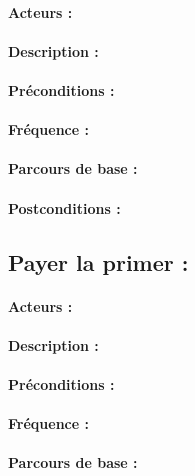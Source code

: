 \documentclass[../annexe.tex]{subfiles}
\begin{document}
\paragraph{Acteurs :}

\paragraph{Description :}

\paragraph{Préconditions :}

\paragraph{Fréquence :}

\paragraph{Parcours de base :}

\paragraph{Postconditions :}

\newpage

\subsection{Payer la primer :}

\paragraph{Acteurs :}

\paragraph{Description :}

\paragraph{Préconditions :}

\paragraph{Fréquence :}

\paragraph{Parcours de base :}
\end{document}
